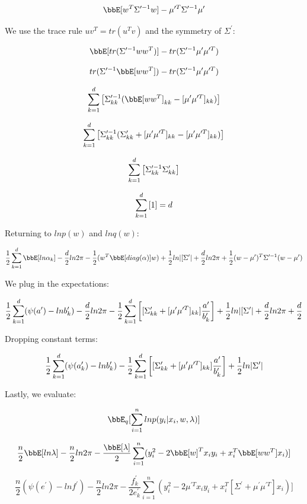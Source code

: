 \documentclass[twoside,11pt]{homework}
\begin{document}
\[
\bbE[w^T \Sigma^{\prime -1}w]
- \mu^{\prime T}\Sigma^{\prime -1} \mu^\prime
\]

We use the trace rule $uv^T = tr(u^Tv)$ and the symmetry of $\Sigma^\prime$:

\[
\bbE[tr(\Sigma^{\prime -1}ww^T)]
- tr(\Sigma^{\prime -1} \mu^\prime \mu^{\prime T})
\]

\[
tr(\Sigma^{\prime -1} \bbE[ww^T])
- tr(\Sigma^{\prime -1} \mu^\prime \mu^{\prime T})
\]

\[
\sum_{k=1}^d \Brackets{
\Sigma^{\prime -1}_{kk} (
\bbE[ww^T]_{kk}
- [\mu^\prime \mu^{\prime T}]_{kk}
)}
\]

\[
\sum_{k=1}^d \left[
\Sigma^{\prime -1}_{kk} (
\Sigma^\prime_{kk} + [\mu^\prime \mu^{\prime T}]_{kk}
- [\mu^\prime \mu^{\prime T}]_{kk}
)\right]
\]

\[
\sum_{k=1}^d \left[
\Sigma^{\prime -1}_{kk} \Sigma^\prime_{kk}\right]
\]

\[
\sum_{k=1}^d \left[1\right] = d
\]

Returning to $lnp(w)$ and $lnq(w)$:

\[
 \frac{1}{2}\sum_{k=1}^d \bbE[ln\alpha_k] - \frac{d}{2}ln2\pi - \frac{1}{2}(w^T\bbE[diag(\alpha)]w)
 + \frac{1}{2}ln|[\Sigma^\prime| + \frac{d}{2}ln2\pi + \frac{1}{2}(w - \mu^\prime)^T\Sigma^{\prime -1}(w - \mu^\prime)
\]

We plug in the expectations:

\[
 \frac{1}{2}\sum_{k=1}^d (\psi(a^\prime) - lnb^\prime_k) - \frac{d}{2}ln2\pi -
 \frac{1}{2}\sum_{k=1}^d \left[[\Sigma^\prime_{kk} + [\mu^\prime \mu^{\prime T}]_{kk}]\frac{a^\prime}{b^\prime_k}\right]
+ \frac{1}{2}ln|[\Sigma^\prime| + \frac{d}{2}ln2\pi + \frac{d}{2}
\]

Dropping constant terms:

\begin{equation}
 \frac{1}{2}\sum_{k=1}^d (\psi(a^\prime_k) - lnb^\prime_k)
 - \frac{1}{2}\sum_{k=1}^d \left[[\Sigma^\prime_{kk} + [\mu^\prime \mu^{\prime T}]_{kk}]\frac{a^\prime}{b^\prime_k}\right]
+ \frac{1}{2}ln|\Sigma^\prime|
\end{equation}


Lastly, we evaluate:

\[
\bbE_q [ \sum_{i=1}^n  ln p(y_i | x_i, w, \lambda)]
\]

\[
\frac{n}{2}\bbE [ln\lambda] - \frac{n}{2}ln2\pi - \frac{\bbE [\lambda]}{2} \sum_{i=1}^n (y_i^2 - 2\bbE [w]^Tx_iy_i + x_i^T\bbE [ww^T]x_i)]
\]

\[
\frac{n}{2}(\psi(e^\prime) - lnf^\prime) - \frac{n}{2}ln2\pi - \frac{f^\prime_k}{2e^\prime_k} \sum_{i=1}^n (y_i^2 - 2\mu^{\prime T}x_iy_i + x_i^T [\Sigma^\prime + \mu^\prime \mu^{\prime T}]x_i)]
\]
\end{document}
